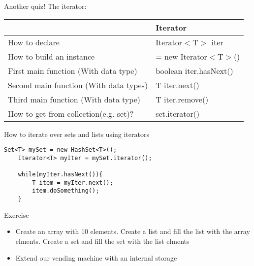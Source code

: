\begin{frame}{Another quiz!}
	The iterator:\\
	\vspace{1cm}
	\begin{tabular}{l|l}
		&Iterator\\
		\hline
		How to declare&Iterator$<$T$>$ iter\\
		\hline
		How to build an instance&= new Iterator$<$T$>$()\\
		\hline
		First main function (With data type)&boolean iter.hasNext()\\
		\hline
		Second main function (With data types)&T iter.next()\\
		\hline
		Third main function (With data type)&T iter.remove()\\
		\hline
		How to get from collection(e.g. set)?&set.iterator()\\
		
	\end{tabular}
\end{frame}

\begin{frame}[fragile]{How to iterate over sets and lists using iterators}
	\begin{lstlisting}[basicstyle=\ttfamily\scriptsize]
	Set<T> mySet = new HashSet<T>();
	Iterator<T> myIter = mySet.iterator();
	
	while(myIter.hasNext()){
		T item = myIter.next();
		item.doSomething();
	}
	\end{lstlisting}
\end{frame}

\begin{frame}{Exercise}
	\begin{itemize}
		\item Create an array with 10 elements. Create a list and fill the list with the array 		elments. Create a set and fill the set with the list elments
		\item Extend our vending machine with an internal storage
	\end{itemize}
\end{frame}

